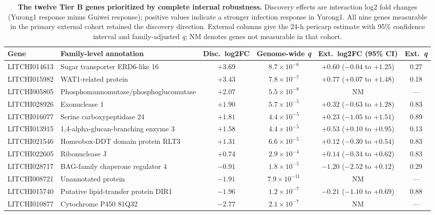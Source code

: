 \documentclass[11pt]{article}
\newcommand{\q}{\textit{q}}
\begin{document}
\begin{table}[t]
\centering
\caption{\textbf{The twelve Tier B genes prioritized by complete internal robustness.} Discovery effects are interaction log2 fold changes (Yurong1 response minus Guiwei response); positive values indicate a stronger infection response in Yurong1. All nine genes measurable in the primary external cohort retained the discovery direction. External columns give the 24-h pericarp estimate with 95\% confidence interval and family-adjusted \q; NM denotes genes not measurable in that cohort.}
\label{tab:tierb}
\footnotesize
\setlength{\tabcolsep}{3pt}
\begin{tabular}{@{}llcccc@{}}
\toprule
\textbf{Gene} & \textbf{Family-level annotation} & \textbf{Disc.\ log2FC} & \textbf{Genome-wide \q} & \textbf{Ext.\ log2FC (95\% CI)} & \textbf{Ext.\ \q} \\
\midrule
LITCHI014613 & Sugar transporter ERD6-like 16 & $+3.69$ & $8.7\times10^{-6}$ & $+0.60$ ($-0.04$ to $+1.25$) & 0.27 \\
LITCHI015982 & WAT1-related protein & $+3.43$ & $7.8\times10^{-7}$ & $+0.77$ ($+0.07$ to $+1.48$) & 0.18 \\
LITCHI005805 & Phosphomannomutase/phosphoglucomutase & $+2.07$ & $5.5\times10^{-8}$ & NM & --- \\
LITCHI028926 & Exonuclease 1 & $+1.90$ & $5.7\times10^{-5}$ & $+0.32$ ($-0.63$ to $+1.28$) & 0.83 \\
LITCHI016077 & Serine carboxypeptidase 24 & $+1.81$ & $4.4\times10^{-5}$ & $+0.23$ ($-1.05$ to $+1.51$) & 0.89 \\
LITCHI013915 & 1,4-alpha-glucan-branching enzyme 3 & $+1.58$ & $4.4\times10^{-5}$ & $+0.53$ ($+0.10$ to $+0.95$) & 0.13 \\
LITCHI021546 & Homeobox-DDT domain protein RLT3 & $+1.31$ & $6.6\times10^{-5}$ & $+0.12$ ($-0.30$ to $+0.54$) & 0.83 \\
LITCHI022605 & Ribonuclease J & $+0.74$ & $2.9\times10^{-4}$ & $+0.14$ ($-0.34$ to $+0.62$) & 0.83 \\
LITCHI028717 & BAG-family chaperone regulator 4 & $-0.91$ & $1.8\times10^{-5}$ & $-1.20$ ($-2.52$ to $+0.12$) & 0.29 \\
LITCHI008721 & Unannotated protein & $-1.91$ & $7.9\times10^{-11}$ & NM & --- \\
LITCHI015740 & Putative lipid-transfer protein DIR1 & $-1.96$ & $1.2\times10^{-7}$ & $-0.21$ ($-1.10$ to $+0.69$) & 0.88 \\
LITCHI010877 & Cytochrome P450 81Q32 & $-2.77$ & $2.1\times10^{-7}$ & NM & --- \\
\bottomrule
\end{tabular}
\end{table}
\end{document}
